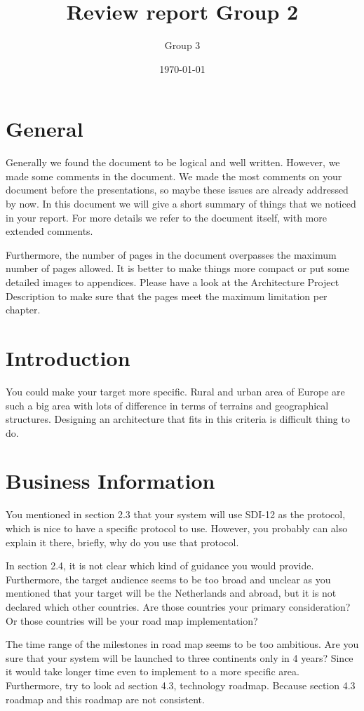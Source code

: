 \documentclass[a4paper,10pt]{article}
\author{Group 3}
\date{\today}
\title{Review report Group 2}
\begin{document}
\maketitle

\section{General}
Generally we found the document to be logical and well written. However, we made some comments in the document. We made the most comments on your document before the presentations, so maybe these issues are already addressed by now. In this document we will give a short summary of things that we noticed in your report. For more details we refer to the document itself, with more extended comments. 

Furthermore, the number of pages in the document overpasses the maximum number of pages allowed. It is better to make things more compact or put some detailed images to appendices. Please have a look at the Architecture Project Description to make sure that the pages meet the maximum limitation per chapter.

\section{Introduction}
You could make your target more specific. Rural and urban area of Europe are such a big area with lots of difference in terms of terrains and geographical structures. Designing an architecture that fits in this criteria is difficult thing to do.

\section{Business Information}
You mentioned in section 2.3 that your system will use SDI-12 as the protocol, which is nice to have a specific protocol to use. However, you probably can also explain it there, briefly, why do you use that protocol.

In section 2.4, it is not clear which kind of guidance you would provide. Furthermore, the target audience seems to be too broad and unclear as you mentioned that your target will be the Netherlands and abroad, but it is not declared which other countries. Are those countries your primary consideration? Or those countries will be your road map implementation?

The time range of the milestones in road map seems to be too ambitious. Are you sure that your system will be launched to three continents only in 4 years? Since it would take longer time even to implement to a more specific area. Furthermore, try to look ad section 4.3, technology roadmap. Because section 4.3 roadmap and this roadmap are not consistent.
\end{document}
